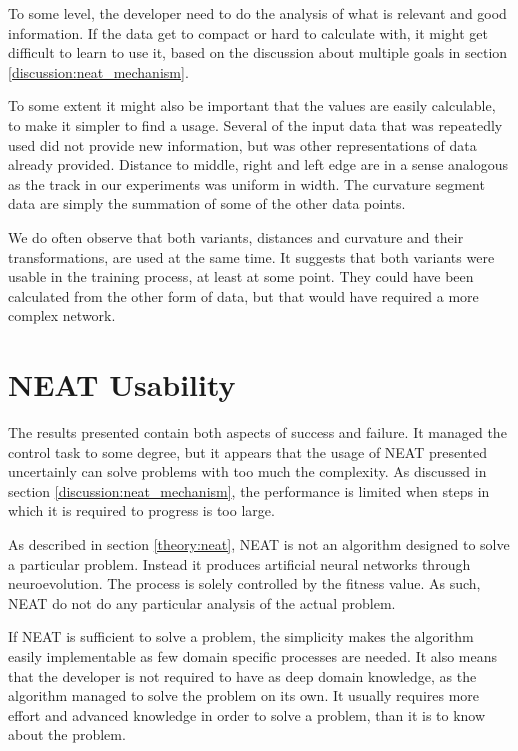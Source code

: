 To some level, the developer need to do the analysis of what is relevant and good information. If the data get to compact or hard to calculate with, it might get difficult to learn to use it, based on the discussion about multiple goals in section \ref{discussion:neat_mechanism}.

To some extent it might also be important that the values are easily calculable, to make it simpler to find a usage. Several of the input data that was repeatedly used did not provide new information, but was other representations of data already provided. Distance to middle, right and left edge are in a sense analogous as the track in our experiments was uniform in width. The curvature segment data are simply the summation of some of the other data points.

We do often observe that both variants, distances and curvature and their transformations, are used at the same time. It suggests that both variants were usable in the training process, at least at some point. They could have been calculated from the other form of data, but that would have required a more complex network.

\section{NEAT Usability}

The results presented contain both aspects of success and failure. It managed the control task to some degree, but it appears that the usage of NEAT presented uncertainly can solve problems with too much the complexity. As discussed in section \ref{discussion:neat_mechanism}, the performance is limited when steps in which it is required to progress is too large.

As described in section \ref{theory:neat}, NEAT is not an algorithm designed to solve a particular problem. Instead it produces artificial neural networks through neuroevolution. The process is solely controlled by the fitness value. As such, NEAT do not do any particular analysis of the actual problem. 

If NEAT is sufficient to solve a problem, the simplicity makes the algorithm easily implementable as few domain specific processes are needed. It also means that the developer is not required to have as deep domain knowledge, as the algorithm managed to solve the problem on its own. It usually requires more effort and advanced knowledge in order to solve a problem, than it is to know about the problem.

